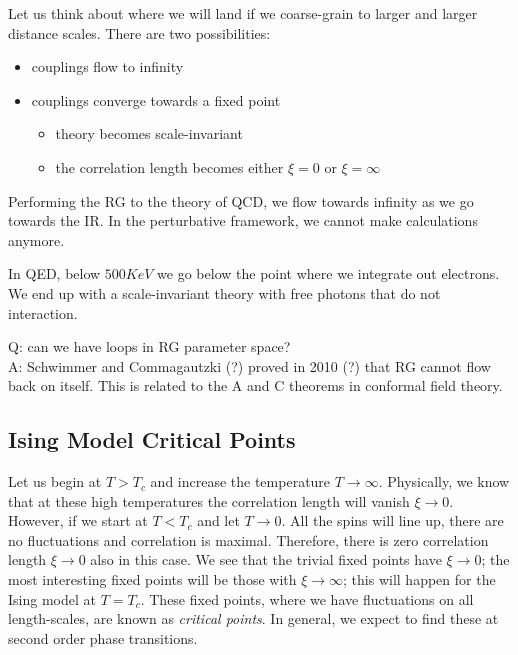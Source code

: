 Let us think about where we will land if we coarse-grain to larger and larger distance scales.
There are two possibilities:
\begin{itemize}
  \item couplings flow to infinity
  \item couplings converge towards a fixed point
    \begin{itemize}
      \item theory becomes scale-invariant
      \item the correlation length becomes either $\xi= 0$ or $\xi= \infty$
    \end{itemize}
\end{itemize}
\begin{example}[]
  Performing the RG to the theory of QCD, we flow towards infinity as we go towards the IR. In the perturbative framework, we cannot make calculations anymore.
\end{example}
\begin{example}
  In QED, below $500 KeV$ we go below the point where we integrate out electrons. We end up with a scale-invariant theory with free photons that do not interaction.
\end{example}
\begin{leftbar}
  \begin{remark}
    Q: can we have loops in RG parameter space?\\
    A: Schwimmer and Commagautzki (?) proved in 2010 (?) that RG cannot flow back on itself.
    This is related to the A and C theorems in conformal field theory.
  \end{remark}
\end{leftbar}

\subsection{Ising Model Critical Points}%
\label{sub:ising_model_critical_points}

Let us begin at $T > T_c$ and increase the temperature $T \to \infty$. Physically, we know that at these high temperatures the correlation length will vanish $\xi\to 0$.
However, if we start at $T < T_c$ and let $T \to 0$. All the spins will line up, there are no fluctuations and correlation is maximal. Therefore, there is zero correlation length $\xi\to 0$ also in this case.
We see that the trivial fixed points have $\xi\to 0$; the most interesting fixed points will be those with $\xi\to \infty$; this will happen for the Ising model at $T = T_c$.
These fixed points, where we have fluctuations on all length-scales, are known as \emph{critical points}.
In general, we expect to find these at second order phase transitions.

